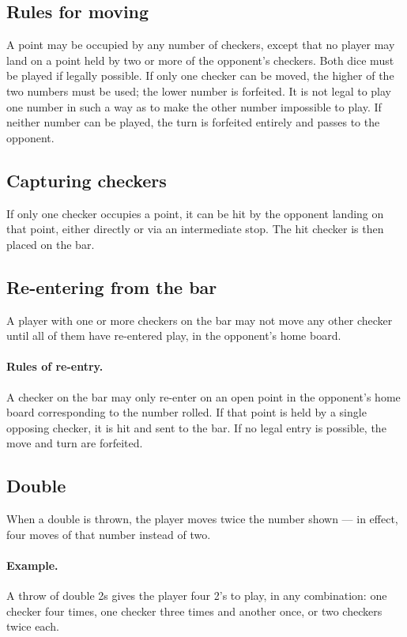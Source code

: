 \documentclass[11pt]{article}
\begin{document}
\subsection*{Rules for moving}
A point may be occupied by any number of checkers, except that no player may land on a point held by two or more of the opponent's checkers. Both dice must be played if legally possible. If only one checker can be moved, the higher of the two numbers must be used; the lower number is forfeited. It is not legal to play one number in such a way as to make the other number impossible to play. If neither number can be played, the turn is forfeited entirely and passes to the opponent.

\subsection*{Capturing checkers}
If only one checker occupies a point, it can be hit by the opponent landing on that point, either directly or via an intermediate stop. The hit checker is then placed on the bar.
\subsection*{Re-entering from the bar}
A player with one or more checkers on the bar may not move any other checker until all of them have re-entered play, in the opponent's home board.
\paragraph{Rules of re-entry.} A checker on the bar may only re-enter on an open point in the opponent's home board corresponding to the number rolled. If that point is held by a single opposing checker, it is hit and sent to the bar. If no legal entry is possible, the move and turn are forfeited.
\subsection*{Double}
When a double is thrown, the player moves twice the number shown — in effect, four moves of that number instead of two.
\paragraph{Example.} A throw of double 2s gives the player four 2's to play, in any combination: one checker four times, one checker three times and another once, or two checkers twice each.
\end{document}
